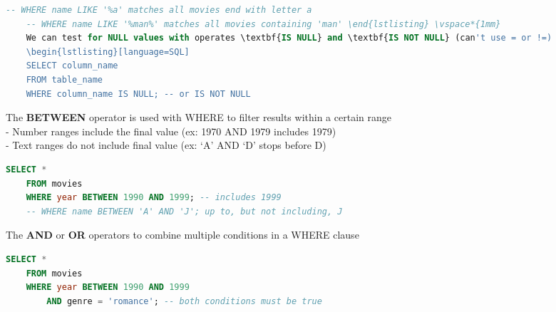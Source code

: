 \documentclass[11pt, a4paper]{article}
\begin{document}
\begin{spacing}{1.1}
\begin{lstlisting}[language=SQL]
	-- WHERE name LIKE '%a' matches all movies end with letter a
	-- WHERE name LIKE '%man%' matches all movies containing 'man' \end{lstlisting} \vspace*{1mm}
	We can test for NULL values with operates \textbf{IS NULL} and \textbf{IS NOT NULL} (can't use = or !=)
	\begin{lstlisting}[language=SQL]
	SELECT column_name
	FROM table_name 
	WHERE column_name IS NULL; -- or IS NOT NULL \end{lstlisting} \vspace*{1mm}
	The \textbf{BETWEEN} operator is used with WHERE to filter results within a certain range \\
	\hspace*{3mm} - Number ranges include the final value (ex: 1970 AND 1979 includes 1979) \\
	\hspace*{3mm} - Text ranges do not include final value (ex: `A' AND `D' stops before D)
	\begin{lstlisting}[language=SQL]
	SELECT *
	FROM movies
	WHERE year BETWEEN 1990 AND 1999; -- includes 1999
	-- WHERE name BETWEEN 'A' AND 'J'; up to, but not including, J \end{lstlisting} \vspace*{1mm}
	The \textbf{AND} or \textbf{OR} operators to combine multiple conditions in a WHERE clause
	\begin{lstlisting}[language=SQL]
	SELECT * 
	FROM movies
	WHERE year BETWEEN 1990 AND 1999
		AND genre = 'romance'; -- both conditions must be true 
	

\end{lstlisting}
\end{spacing}
\end{document}
